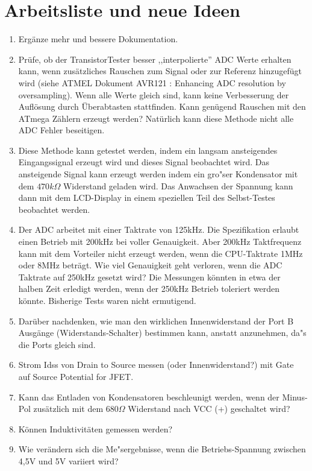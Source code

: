 
\chapter{Arbeitsliste und neue Ideen}
\label{sec:todo}

\begin{enumerate}
\item Erg\"anze mehr und bessere Dokumentation.
\item Pr\"ufe, ob der TransistorTester besser ,,interpolierte''  ADC Werte erhalten kann, wenn zus\"atz\-liches Rauschen zum Signal
oder zur Referenz hinzugef\"ugt wird (siehe ATMEL Dokument AVR121 \cite{AVR121}: Enhancing ADC resolution by oversampling).
Wenn alle Werte gleich sind, kann keine Verbesserung der Aufl\"osung durch \"Uberabtasten stattfinden.
Kann gen\"ugend Rauschen mit den ATmega Z\"ahlern erzeugt werden?
Nat\"urlich kann diese Methode nicht alle ADC Fehler beseitigen.
\item Diese Methode kann getestet werden, indem ein langsam ansteigendes Eingangssignal erzeugt wird und dieses
Signal beobachtet wird.
Das ansteigende Signal kann erzeugt werden indem ein gro"ser Kondensator mit dem \(470k\Omega\) Widerstand geladen wird.
Das Anwachsen der Spannung kann dann mit dem LCD-Display in einem speziellen Teil des Selbst-Testes beobachtet werden.
\item Der ADC arbeitet mit einer Taktrate von 125kHz. Die Spezifikation erlaubt einen Betrieb mit 200kHz bei voller Genauigkeit.
Aber 200kHz Taktfrequenz kann mit dem Vorteiler nicht erzeugt werden, wenn die CPU-Taktrate 1MHz oder 8MHz betr\"agt.
Wie viel Genauigkeit geht verloren, wenn die ADC Taktrate auf 250kHz gesetzt wird?
Die Messungen k\"onnten in etwa der halben Zeit erledigt werden, wenn der 250kHz Betrieb toleriert werden k\"onnte.
Bisherige Tests waren nicht ermutigend.
\item Dar\"uber nachdenken, wie man den wirklichen Innenwiderstand der Port B Aus\-g\"an\-ge (Wider\-stands-Schal\-ter) bestimmen kann,
anstatt anzunehmen, da"s die Ports gleich sind.
\item Strom Idss von Drain to Source messen (oder Innenwiderstand?) mit Gate auf Source Potential for JFET.
\item Kann das Entladen von Kondensatoren beschleunigt werden, wenn der Minus-Pol zus\"atzlich mit dem \(680\Omega\) 
Widerstand nach VCC (+) geschaltet wird?
\item K\"onnen Induktivit\"aten gemessen werden?
\item Wie ver\"andern sich die Me"sergebnisse, wenn die Betriebs-Spannung zwischen 4,5V und 5V variiert wird?

\end{enumerate}
